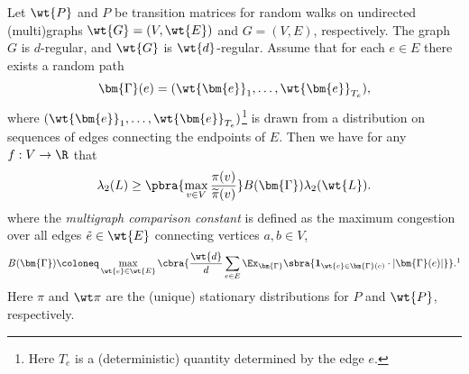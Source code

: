 \begin{corollary}
\label{cor:comparison random walks}
    Let $\wt{P}$ and $P$ be transition matrices for random walks on undirected (multi)graphs $\wt{G}=(V,\wt{E})$ and $G=(V,E)$, respectively. The graph $G$ is $d$-regular, and $\wt{G}$ is $\wt{d}$-regular. Assume that for each $e\in E$ there exists a random path
    \begin{align*}
        \bm{\Gamma}(e)=(\wt{\bm{e}}_1,\dots,\wt{\bm{e}}_{T_e}),
    \end{align*}
    where $(\wt{\bm{e}}_1,\dots,\wt{\bm{e}}_{T_e})$\footnote{Here $T_e$ is a (deterministic) quantity determined by the edge $e$.} is drawn from a distribution on sequences of edges connecting the endpoints of $E$. Then we have for any $f:V\to\R$ that
    \begin{align*}
        \lambda_2(L)\geq \pbra{\max_{v\in V}\frac{\pi(v)}{\widetilde{\pi}(v)}}B(\bm{\Gamma})\lambda_2(\wt{L}).
    \end{align*}
    where the \emph{multigraph comparison constant} is defined as the maximum congestion over all edges $\tilde{e} \in \wt{E}$ connecting vertices $a,b\in V$,
    \begin{align*}
        B(\bm{\Gamma}) \coloneq \max_{\wt{e}\in \wt{E}} \cbra{\frac{\wt{d}}{d}\sum_{e\in E}\Ex_{\bm{\Gamma}}\sbra{\mathbf{1}_{\wt{e} \in \bm{\Gamma}(e)}\cdot |\bm{\Gamma}(e)|}}.\footnotemark
    \end{align*}
    Here $\pi$ and $\wt\pi$ are the (unique) stationary distributions for $P$ and $\wt{P}$, respectively.
\end{corollary}
